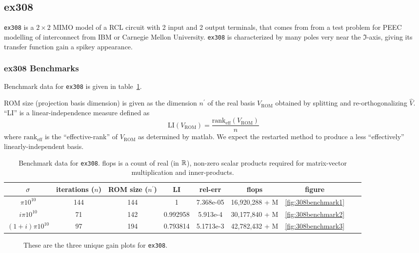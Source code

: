 \subsection{ex308}
\texttt{ex308} is a $2\times2$  MIMO model of a RCL circuit with 2 input and 2 output terminals,  that comes from from a test problem for PEEC modelling of interconnect from IBM or Carnegie Mellon University.   
\texttt{ex308} is characterized by many poles very near the $\Im$-axis, giving its transfer function gain a spikey appearance.
 
\subsubsection{ex308 Benchmarks}
   Benchmark data for \texttt{ex308} is given in table~\ref{tab:308tab1}.  

ROM size (projection basis dimension) is given as the dimension $n^\prime$ of the real basis $V_{\text{ROM}}$ obtained by splitting and re-orthogonalizing $\widehat{V}$.  ``LI'' is a linear-independence measure defined as 
\[\text{LI}\left(V_{\text{ROM}}\right) =
\frac{\text{rank}_\text{eff}\left(V_{\text{ROM}}\right)}{n}
\]  
where $\text{rank}_\text{eff}$ is the ``effective-rank'' of $V_{\text{ROM}}$ as determined by matlab.  We expect the restarted method to produce a less ``effectively'' linearly-independent basis. 
 
\begin{table}
\centering
\begin{tabular}{|c|c|c|c|c|c|c|c|c|}
\hline
$\sigma$ & iterations ($n$) & ROM size ($n^\prime$) & LI  & rel-err  & flops & figure  \\
\hline
$\pi 10^{10}$  & 144  &144 & 1 &7.368e-05   &  16,920,288 + M& \ref{fig:308benchmark1}  \\
$i \pi  10^{10}$ &  71 &142 & 0.992958 &5.913e-4 & 30,177,840 + M  &\ref{fig:308benchmark2} \\
$(1+i)\pi 10^{10}$ & 97 & 194& 0.793814&5.1713e-3 &  42,782,432 + M&\ref{fig:308benchmark3} \\
\hline
\end{tabular}
\caption{\label{tab:308tab1}Benchmark data for \texttt{ex308}.  flops is a count of real (in $\mathbb{R}$), non-zero scalar products required for matrix-vector multiplication and inner-products.    }
\end{table}



\begin{figure}
\caption{\label{fig:ex308FR_all} These are the three unique gain plots for \texttt{ex308}. }
\end{figure}


